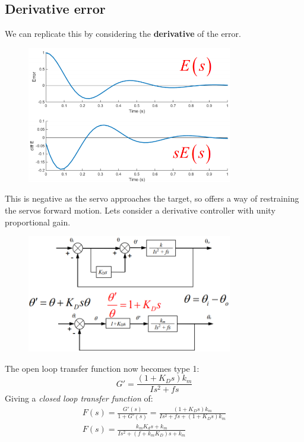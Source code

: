 \documentclass[class=report, crop=false, 12pt,a4paper]{standalone}
\begin{document}
\subsection{Derivative error}
We can replicate this by considering the \textbf{derivative} of the error. 
\begin{figure}[H]
  \centerline{\includegraphics[width = 0.8\textwidth]{../img/diagram121.png}}
  \caption{}
\end{figure}
This is negative as the servo approaches the target, so offers a way of restraining the servos forward motion. Lets consider a derivative controller with unity proportional gain.
\begin{figure}[H]
  \centerline{\includegraphics[width = 0.8\textwidth]{../img/diagram122.png}}
  \caption{}
\end{figure}
The open loop transfer function now becomes type 1: 
\begin{equation}
  G' = \frac{\left( 1 + K_D s \right) k_m}{Is^2 + fs}
\end{equation}
Giving a \textit{closed loop transfer function} of:
\begin{gather}
  F(s) = \frac{G'(s)}{1 + G'(s)} = \frac{\left( 1 + K_D s \right)k_m}{Is^2 + fs + \left( 1+K_D s\right)k_m}\\
  F(s) = \frac{k_m K_d s + k_m}{Is^2 + \left( f + k_m K_D\right)s + k_m}
\end{gather}
\end{document}
